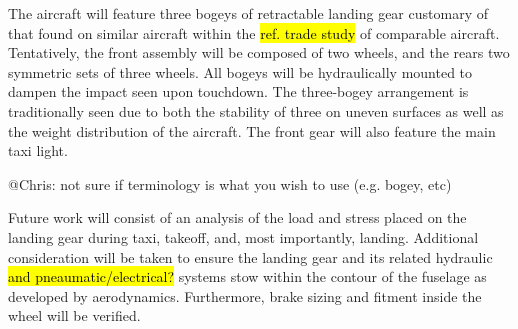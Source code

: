 The aircraft will feature three bogeys of retractable landing gear customary of that found on similar aircraft within the \hl{ref. trade study} of comparable aircraft.  Tentatively, the front assembly will be composed of two wheels, and the rears two symmetric sets of three wheels.  All bogeys will be hydraulically mounted to dampen the impact seen upon touchdown.  The three-bogey arrangement is traditionally seen due to both the stability of three on uneven surfaces as well as the weight distribution of the aircraft.  The front gear will also feature the main taxi light.  

@Chris: not sure if terminology is what you wish to use (e.g. bogey, etc)

Future work will consist of an analysis of the load and stress placed on the landing gear during taxi, takeoff, and, most importantly, landing.  Additional consideration will be taken to ensure the landing gear and its related hydraulic \hl{and pneaumatic/electrical?} systems stow within the contour of the fuselage as developed by aerodynamics.  Furthermore, brake sizing and fitment inside the wheel will be verified.  



